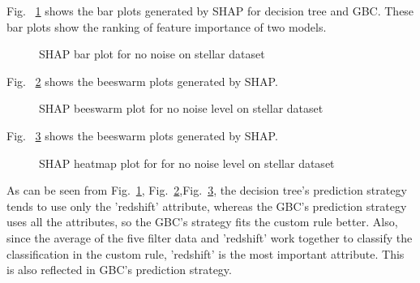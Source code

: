 \documentclass[runningheads,a4paper]{llncs}
\begin{document}
Fig. ~\ref{bar plots no noise stellar} shows the bar plots generated by SHAP for decision tree and GBC. These bar plots show the ranking of feature importance of two models.
\begin{figure}[H]
	\centering
	
	\hfill
	
	
	\caption{SHAP bar plot for no noise on stellar dataset}
	\label{bar plots no noise stellar}
\end{figure}



Fig. ~\ref{bee plots no noise stellar} shows the beeswarm plots generated by SHAP.
\begin{figure}[H]
	\centering
	
	\hfill
	
	
	\caption{SHAP beeswarm plot for no noise level on stellar dataset}
	\label{bee plots no noise stellar}
	
\end{figure}
Fig. ~\ref{heat plots no noise stellar} shows the beeswarm plots generated by SHAP.
\begin{figure}[H]
	\centering
	
	\hfill
	
	
	\caption{SHAP heatmap plot for for no noise level on stellar dataset}
	\label{heat plots no noise stellar}
	
\end{figure}

As can be seen from Fig.~\ref{bar plots no noise stellar}, Fig.~\ref{bee plots no noise stellar},Fig.~\ref{heat plots no noise stellar}, the decision tree's prediction strategy tends to use only the 'redshift' attribute, whereas the GBC's prediction strategy uses all the attributes, so the GBC's strategy fits the custom rule better. Also, since the average of the five filter data and 'redshift' work together to classify the classification in the custom rule, 'redshift' is the most important attribute. This is also reflected in GBC's prediction strategy.
\end{document}
